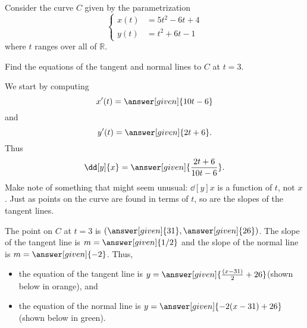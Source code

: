 \documentclass{ximera}
\begin{document}
\begin{example}
Consider the curve $C$ given by the parametrization
\[ 
\begin{cases}
x(t)&=5t^2-6t+4 \\
y(t)&=t^2+6t-1
\end{cases}
\]
where $t$ ranges over all of $\mathbb{R}$. 

 Find the equations of the tangent and normal lines
  to $C$ at $t=3$.
  \begin{explanation}
    We start by computing
    \[
    x'(t) = \answer[given]{10t-6}
    \]
    and
    \[
    y'(t) =\answer[given]{2t+6}.
    \]
    Thus
    \[
    \dd[y]{x} = \answer[given]{\frac{2t+6}{10t-6}}.
    \]
    Make note of something that might seem unusual: $\dd[y]{x}$ is a
    function of $t$, not $x$. Just as points on the curve are found in
    terms of $t$, so are the slopes of the tangent lines.
		
    The point on $C$ at $t=3$ is $(\answer[given]{31},\answer[given]{26})$. The slope of the tangent
    line is $m=\answer[given]{1/2}$ and the slope of the normal line is $m=\answer[given]{-2}$. Thus,
    \begin{itemize}
    \item the equation of the tangent line is
      $y=\answer[given]{\frac{(x-31)}{2}+26}$(shown below in orange), and
    \item the equation of the normal line is
      $y=\answer[given]{-2(x-31)+26}$(shown below in green).
    \end{itemize}
  \end{explanation}


\begin{image}
\end{image}



\end{example}
\end{document}
